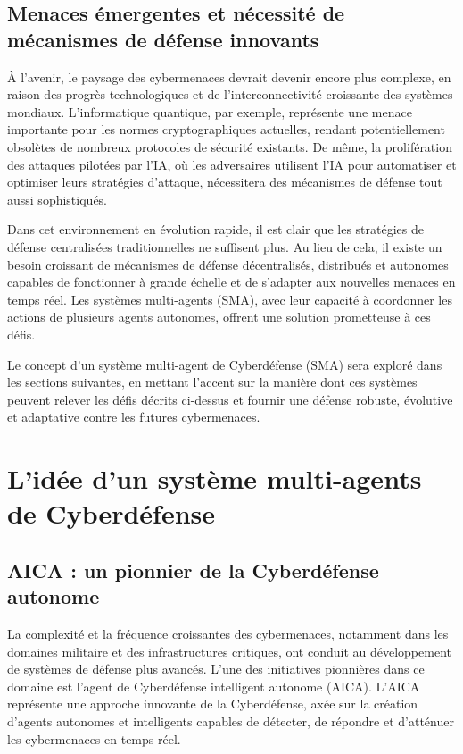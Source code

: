 \subsection{Menaces émergentes et nécessité de mécanismes de défense innovants}

À l’avenir, le paysage des cybermenaces devrait devenir encore plus complexe, en raison des progrès technologiques et de l’interconnectivité croissante des systèmes mondiaux. L’informatique quantique, par exemple, représente une menace importante pour les normes cryptographiques actuelles, rendant potentiellement obsolètes de nombreux protocoles de sécurité existants\cite{mosca2018cybersecurity}\cite{bernstein2017post}. De même, la prolifération des attaques pilotées par l’IA, où les adversaires utilisent l’IA pour automatiser et optimiser leurs stratégies d’attaque, nécessitera des mécanismes de défense tout aussi sophistiqués\cite{brundage2018malicious}.

Dans cet environnement en évolution rapide, il est clair que les stratégies de défense centralisées traditionnelles ne suffisent plus. Au lieu de cela, il existe un besoin croissant de mécanismes de défense décentralisés, distribués et autonomes capables de fonctionner à grande échelle et de s'adapter aux nouvelles menaces en temps réel. Les systèmes multi-agents (SMA), avec leur capacité à coordonner les actions de plusieurs agents autonomes, offrent une solution prometteuse à ces défis.

Le concept d'un système multi-agent de Cyberdéfense (SMA) sera exploré dans les sections suivantes, en mettant l'accent sur la manière dont ces systèmes peuvent relever les défis décrits ci-dessus et fournir une défense robuste, évolutive et adaptative contre les futures cybermenaces.


\section{L'idée d'un système multi-agents de Cyberdéfense}

\subsection{AICA : un pionnier de la Cyberdéfense autonome}

La complexité et la fréquence croissantes des cybermenaces, notamment dans les domaines militaire et des infrastructures critiques, ont conduit au développement de systèmes de défense plus avancés. L'une des initiatives pionnières dans ce domaine est l'agent de Cyberdéfense intelligent autonome (AICA). L'AICA représente une approche innovante de la Cyberdéfense, axée sur la création d'agents autonomes et intelligents capables de détecter, de répondre et d'atténuer les cybermenaces en temps réel.

